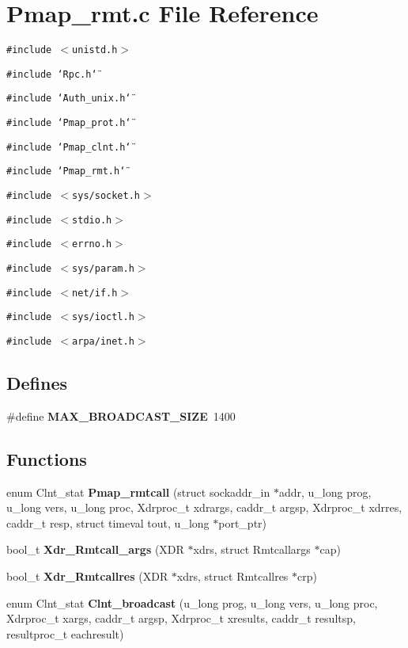\section{Pmap\_\-rmt.c File Reference}
\label{Pmap__rmt_8c}
{\tt \#include $<$unistd.h$>$}\par
{\tt \#include \char`\"{}Rpc.h\char`\"{}}\par
{\tt \#include \char`\"{}Auth\_\-unix.h\char`\"{}}\par
{\tt \#include \char`\"{}Pmap\_\-prot.h\char`\"{}}\par
{\tt \#include \char`\"{}Pmap\_\-clnt.h\char`\"{}}\par
{\tt \#include \char`\"{}Pmap\_\-rmt.h\char`\"{}}\par
{\tt \#include $<$sys/socket.h$>$}\par
{\tt \#include $<$stdio.h$>$}\par
{\tt \#include $<$errno.h$>$}\par
{\tt \#include $<$sys/param.h$>$}\par
{\tt \#include $<$net/if.h$>$}\par
{\tt \#include $<$sys/ioctl.h$>$}\par
{\tt \#include $<$arpa/inet.h$>$}\par
\subsection*{Defines}
\begin{CompactItemize}
\item 
\#define {\bf MAX\_\-BROADCAST\_\-SIZE}\ 1400
\end{CompactItemize}
\subsection*{Functions}
\begin{CompactItemize}
\item 
enum Clnt\_\-stat {\bf Pmap\_\-rmtcall} (struct sockaddr\_\-in $\ast$addr, u\_\-long prog, u\_\-long vers, u\_\-long proc, Xdrproc\_\-t xdrargs, caddr\_\-t argsp, Xdrproc\_\-t xdrres, caddr\_\-t resp, struct timeval tout, u\_\-long $\ast$port\_\-ptr)
\item 
bool\_\-t {\bf Xdr\_\-Rmtcall\_\-args} (XDR $\ast$xdrs, struct Rmtcallargs $\ast$cap)
\item 
bool\_\-t {\bf Xdr\_\-Rmtcallres} (XDR $\ast$xdrs, struct Rmtcallres $\ast$crp)
\item 
enum Clnt\_\-stat {\bf Clnt\_\-broadcast} (u\_\-long prog, u\_\-long vers, u\_\-long proc, Xdrproc\_\-t xargs, caddr\_\-t argsp, Xdrproc\_\-t xresults, caddr\_\-t resultsp, resultproc\_\-t eachresult)
\end{CompactItemize}


